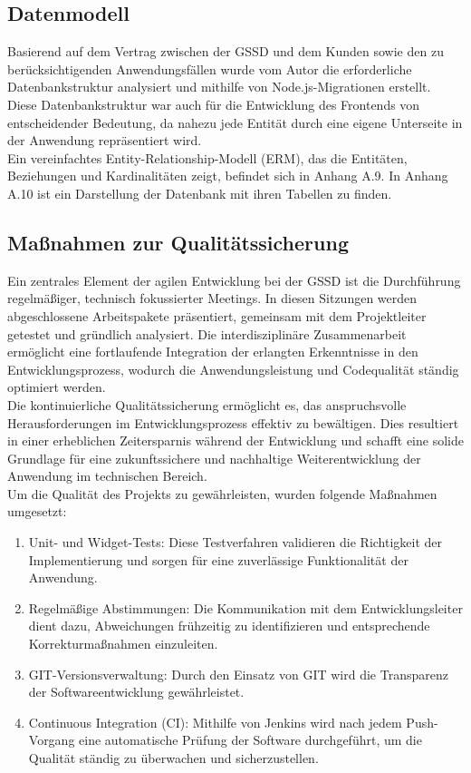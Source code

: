 \begin{flushleft}
	\subsection{Datenmodell}
	Basierend auf dem Vertrag zwischen der \acs{GSSD} und dem Kunden sowie den zu berücksichtigenden Anwendungsfällen wurde vom Autor die erforderliche Datenbankstruktur analysiert und mithilfe von Node.js-Migrationen erstellt.
	\\
	Diese Datenbankstruktur war auch für die Entwicklung des Frontends von entscheidender Bedeutung, da nahezu jede Entität durch eine eigene Unterseite in der Anwendung repräsentiert wird.
	\\
	Ein vereinfachtes Entity-Relationship-Modell (ERM), das die Entitäten, Beziehungen und Kardinalitäten zeigt, befindet sich in Anhang A.9. In Anhang A.10 ist ein Darstellung der Datenbank mit ihren Tabellen zu finden.
	\subsection{Maßnahmen zur Qualitätssicherung}

	Ein zentrales Element der agilen Entwicklung bei der \acs{GSSD} ist die Durchführung regelmäßiger, technisch fokussierter Meetings. In diesen Sitzungen werden abgeschlossene Arbeitspakete präsentiert, gemeinsam mit dem Projektleiter getestet und gründlich analysiert. Die interdisziplinäre Zusammenarbeit ermöglicht eine fortlaufende Integration der erlangten Erkenntnisse in den Entwicklungsprozess, wodurch die Anwendungsleistung und Codequalität ständig optimiert werden.
	\\
	Die kontinuierliche Qualitätssicherung ermöglicht es, das anspruchsvolle Herausforderungen im Entwicklungsprozess effektiv zu bewältigen. Dies resultiert in einer erheblichen Zeitersparnis während der Entwicklung und schafft eine solide Grundlage für eine zukunftssichere und nachhaltige Weiterentwicklung der Anwendung im technischen Bereich.
	\\
	Um die Qualität des Projekts zu gewährleisten, wurden folgende Maßnahmen umgesetzt:
	\begin{enumerate}
	\item Unit- und Widget-Tests: Diese Testverfahren validieren die Richtigkeit der Implementierung und sorgen für eine zuverlässige Funktionalität der Anwendung.
	\item Regelmäßige Abstimmungen: Die Kommunikation mit dem Entwicklungsleiter dient dazu, Abweichungen frühzeitig zu identifizieren und entsprechende Korrekturmaßnahmen einzuleiten.
	\item GIT-Versionsverwaltung: Durch den Einsatz von GIT wird die Transparenz der Softwareentwicklung gewährleistet.
	\item Continuous Integration (CI): Mithilfe von Jenkins wird nach jedem Push-Vorgang eine automatische Prüfung der Software durchgeführt, um die Qualität ständig zu überwachen und sicherzustellen.
	\end{enumerate}


\end{flushleft}
